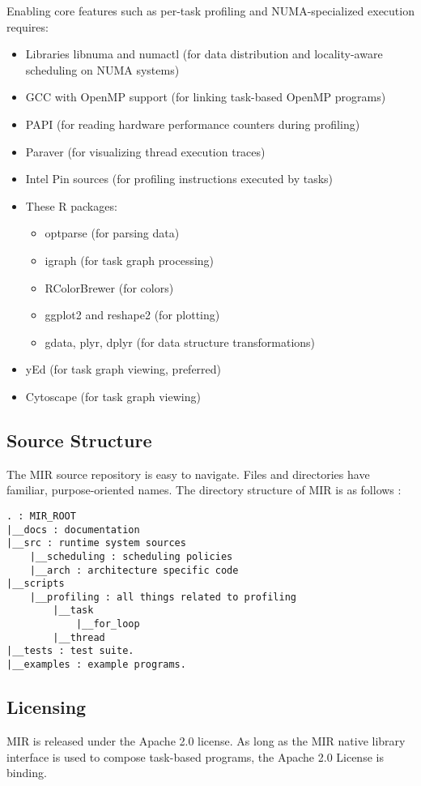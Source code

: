 \documentclass[11pt,a4paper]{article}
\begin{document}
Enabling core features such as per-task profiling and NUMA-specialized execution requires:

\begin{itemize}
\item Libraries libnuma and numactl (for data distribution and locality-aware scheduling on NUMA systems)
\item GCC with OpenMP support (for linking task-based OpenMP programs)
\item PAPI (for reading hardware performance counters during profiling)
\item Paraver (for visualizing thread execution traces)
\item Intel Pin sources (for profiling instructions executed by tasks)
\item These R packages:
  \begin{itemize}
  \item optparse (for parsing data)
  \item igraph (for task graph processing)
  \item RColorBrewer (for colors)
  \item ggplot2 and reshape2 (for plotting)
  \item gdata, plyr, dplyr (for data structure transformations)
  \end{itemize}
\item yEd (for task graph viewing, preferred)
\item Cytoscape (for task graph viewing)
\end{itemize}

\subsection{Source Structure}\label{source-structure}

The MIR source repository is easy to navigate. Files and directories have familiar, purpose-oriented names. The directory structure of MIR is as follows :

\begin{lstlisting}[style=MyInputStyle]
. : MIR_ROOT
|__docs : documentation
|__src : runtime system sources
    |__scheduling : scheduling policies
    |__arch : architecture specific code
|__scripts
    |__profiling : all things related to profiling
        |__task
            |__for_loop
        |__thread
|__tests : test suite.
|__examples : example programs.
\end{lstlisting}

\subsection{Licensing}\label{license}
MIR is released under the Apache 2.0 license.
As long as the MIR native library interface is used to compose task-based programs, the Apache 2.0 License is binding.
\end{document}
